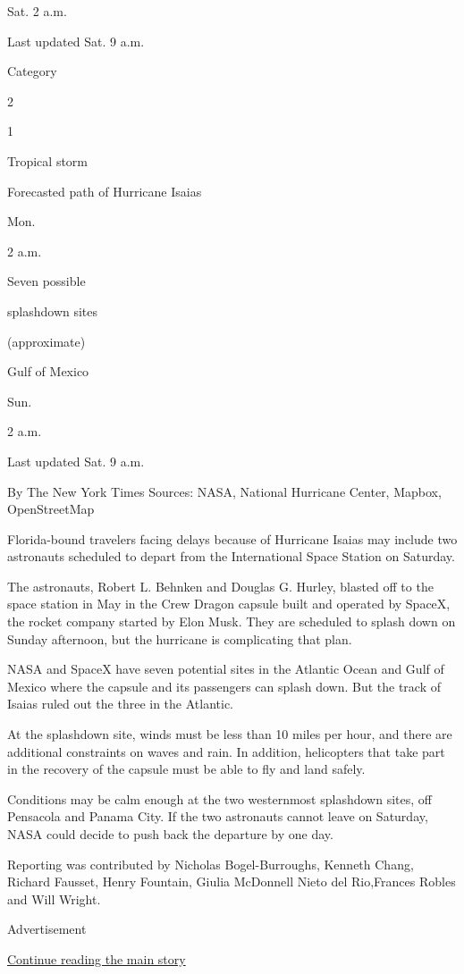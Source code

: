 Sat. 2 a.m.

Last updated Sat. 9 a.m.

Category

2

1

Tropical storm

Forecasted path of Hurricane Isaias

Mon.

2 a.m.

Seven possible

splashdown sites

(approximate)

Gulf of Mexico

Sun.

2 a.m.

Last updated Sat. 9 a.m.

By The New York Times \textbar{} Sources: NASA, National Hurricane
Center, Mapbox, OpenStreetMap

Florida-bound travelers facing delays because of Hurricane Isaias may
include two astronauts scheduled to depart from the International Space
Station on Saturday.

The astronauts, Robert L. Behnken and Douglas G. Hurley, blasted off to
the space station in May in the Crew Dragon capsule built and operated
by SpaceX, the rocket company started by Elon Musk. They are scheduled
to splash down on Sunday afternoon, but the hurricane is complicating
that plan.

NASA and SpaceX have seven potential sites in the Atlantic Ocean and
Gulf of Mexico where the capsule and its passengers can splash down. But
the track of Isaias ruled out the three in the Atlantic.

At the splashdown site, winds must be less than 10 miles per hour, and
there are additional constraints on waves and rain. In addition,
helicopters that take part in the recovery of the capsule must be able
to fly and land safely.

Conditions may be calm enough at the two westernmost splashdown sites,
off Pensacola and Panama City. If the two astronauts cannot leave on
Saturday, NASA could decide to push back the departure by one day.

Reporting was contributed by Nicholas Bogel-Burroughs, Kenneth Chang,
Richard Fausset, Henry Fountain, Giulia McDonnell Nieto del Rio,Frances
Robles and Will Wright.

Advertisement

\protect\hyperlink{after-bottom}{Continue reading the main story}

